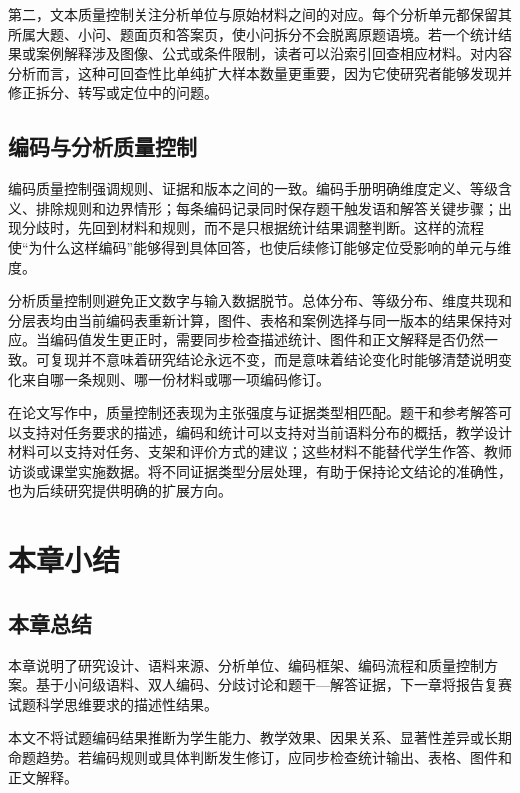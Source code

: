\documentclass[
  12pt,
  a4paper]{ctexbook}
\begin{document}
第二，文本质量控制关注分析单位与原始材料之间的对应。每个分析单元都保留其所属大题、小问、题面页和答案页，使小问拆分不会脱离原题语境。若一个统计结果或案例解释涉及图像、公式或条件限制，读者可以沿索引回查相应材料。对内容分析而言，这种可回查性比单纯扩大样本数量更重要，因为它使研究者能够发现并修正拆分、转写或定位中的问题。

\subsection{编码与分析质量控制}\label{ux7f16ux7801ux4e0eux5206ux6790ux8d28ux91cfux63a7ux5236}

编码质量控制强调规则、证据和版本之间的一致。编码手册明确维度定义、等级含义、排除规则和边界情形；每条编码记录同时保存题干触发语和解答关键步骤；出现分歧时，先回到材料和规则，而不是只根据统计结果调整判断。这样的流程使``为什么这样编码''能够得到具体回答，也使后续修订能够定位受影响的单元与维度。

分析质量控制则避免正文数字与输入数据脱节。总体分布、等级分布、维度共现和分层表均由当前编码表重新计算，图件、表格和案例选择与同一版本的结果保持对应。当编码值发生更正时，需要同步检查描述统计、图件和正文解释是否仍然一致。可复现并不意味着研究结论永远不变，而是意味着结论变化时能够清楚说明变化来自哪一条规则、哪一份材料或哪一项编码修订。

在论文写作中，质量控制还表现为主张强度与证据类型相匹配。题干和参考解答可以支持对任务要求的描述，编码和统计可以支持对当前语料分布的概括，教学设计材料可以支持对任务、支架和评价方式的建议；这些材料不能替代学生作答、教师访谈或课堂实施数据。将不同证据类型分层处理，有助于保持论文结论的准确性，也为后续研究提供明确的扩展方向。

\section{本章小结}\label{ux672cux7ae0ux5c0fux7ed3-2}

\subsection{本章总结}\label{ux672cux7ae0ux603bux7ed3-2}

本章说明了研究设计、语料来源、分析单位、编码框架、编码流程和质量控制方案。基于小问级语料、双人编码、分歧讨论和题干---解答证据，下一章将报告复赛试题科学思维要求的描述性结果。

本文不将试题编码结果推断为学生能力、教学效果、因果关系、显著性差异或长期命题趋势。若编码规则或具体判断发生修订，应同步检查统计输出、表格、图件和正文解释。
\end{document}
